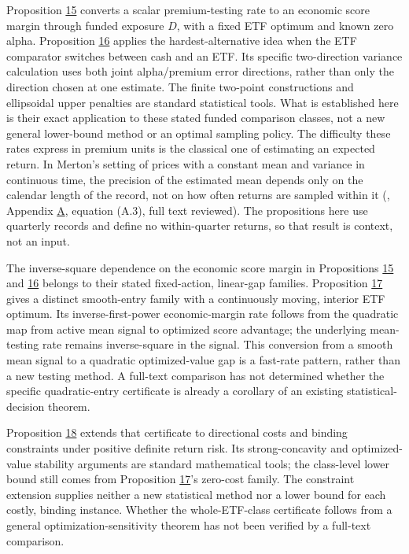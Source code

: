 \documentclass[11pt]{article}
\begin{document}
Proposition \hyperref[res:Proposition-15]{15} converts a scalar premium-testing rate to an
economic score margin through funded exposure \(D\), with a fixed
ETF optimum and known zero alpha. Proposition \hyperref[res:Proposition-16]{16} applies the
hardest-alternative idea when the ETF comparator switches between
cash and an ETF. Its specific two-direction variance calculation
uses both joint alpha/premium error directions, rather than only
the direction chosen at one estimate. The finite two-point
constructions and ellipsoidal upper penalties are standard
statistical tools. What is established here is their exact
application to these stated funded comparison classes, not a
new general lower-bound method or an optimal sampling policy.
The difficulty these rates express in premium units is the
classical one of estimating an expected return. In Merton's setting
of prices with a constant mean and variance in continuous time, the
precision of the estimated mean depends only on the calendar length
of the record, not on how often returns are sampled within it
(\cite{merton1980estimating}, Appendix \hyperref[sec:A]{A}, equation (A.3), full text
reviewed). The propositions here use quarterly records and define
no within-quarter returns, so that result is context, not an input.

The inverse-square dependence on the economic score margin in
Propositions \hyperref[res:Proposition-15]{15} and \hyperref[res:Proposition-16]{16} belongs to their stated fixed-action,
linear-gap families. Proposition \hyperref[res:Proposition-17]{17} gives a distinct smooth-entry
family with a continuously moving, interior ETF optimum. Its
inverse-first-power economic-margin rate follows from the
quadratic map from active mean signal to optimized score advantage;
the underlying mean-testing rate remains inverse-square in the
signal. This conversion from a smooth mean signal to a
quadratic optimized-value gap is a fast-rate pattern, rather
than a new testing method. A full-text comparison has not determined
whether the specific quadratic-entry certificate is already a
corollary of an existing statistical-decision theorem.

Proposition \hyperref[res:Proposition-18]{18} extends that certificate to directional costs
and binding constraints under positive definite return risk.
Its strong-concavity and optimized-value stability arguments
are standard mathematical tools; the class-level lower bound
still comes from Proposition \hyperref[res:Proposition-17]{17}'s zero-cost family. The
constraint extension supplies neither a new statistical
method nor a lower bound for each costly, binding instance.
Whether the whole-ETF-class certificate follows from a general
optimization-sensitivity theorem has not been verified by a
full-text comparison.
\end{document}
